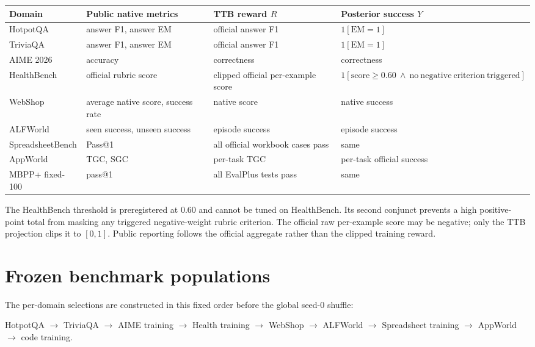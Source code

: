 \documentclass[11pt]{article}
\begin{document}
\small
\begin{tabular}{p{}p{}p{}p{}}
\hline
Domain & Public native metrics & TTB reward $R$ & Posterior success $Y$ \\
\hline
HotpotQA & answer F1, answer EM & official answer F1 & $1[\mathrm{EM}=1]$ \\
TriviaQA & answer F1, answer EM & official answer F1 & $1[\mathrm{EM}=1]$ \\
AIME 2026 & accuracy & correctness & correctness \\
HealthBench & official rubric score & clipped official per-example score &
$1[\mathrm{score}\geq0.60\ \land\ \mathrm{no\ negative\ criterion\ triggered}]$ \\
WebShop & average native score, success rate & native score & native success \\
ALFWorld & seen success, unseen success & episode success & episode success \\
SpreadsheetBench & Pass@1 & all official workbook cases pass & same \\
AppWorld & TGC, SGC & per-task TGC & per-task official success \\
MBPP+ fixed-100 & pass@1 & all EvalPlus tests pass & same \\
\hline
\end{tabular}
\normalsize

The HealthBench threshold is preregistered at 0.60 and cannot be tuned on
HealthBench.  Its second conjunct prevents a high positive-point total from
masking any triggered negative-weight rubric criterion.  The official raw
per-example score may be negative; only the TTB projection clips it to
$[0,1]$.  Public reporting follows the official aggregate rather than the
clipped training reward.

\section{Frozen benchmark populations}

The per-domain selections are constructed in this fixed order before the
global seed-0 shuffle:

\begin{center}
HotpotQA $\rightarrow$ TriviaQA $\rightarrow$ AIME training $\rightarrow$
Health training $\rightarrow$ WebShop $\rightarrow$ ALFWorld $\rightarrow$
Spreadsheet training $\rightarrow$ AppWorld $\rightarrow$ code training.
\end{center}
\end{document}
